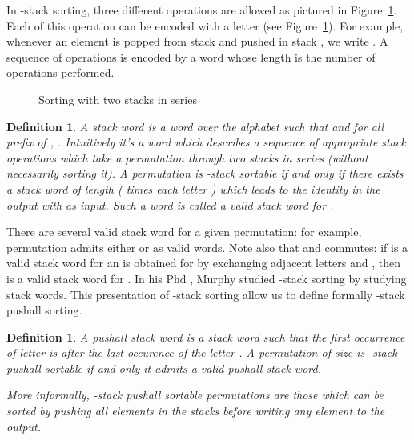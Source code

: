 \documentclass[11pt]{article}
\newtheorem{defn}[thm]{Definition}
\begin{document}
In -stack sorting, three different operations are allowed as pictured in Figure~\ref{fig:rholambdamu}. 
Each of this operation can be encoded with a letter (see Figure~\ref{fig:rholambdamu}).
For example, whenever an element is popped from stack  and pushed in stack , we write . 
A sequence of operations is encoded by a word whose length is the number of operations performed.

\begin{figure}[H]
\begin{center}
\caption{Sorting with two stacks in series \label{fig:rholambdamu}}
\end{center}
\end{figure}

\begin{defn}
A {\em stack word}  is a word over the alphabet  such that  and for all prefix  of , . 
Intuitively it's a word which describes a sequence of appropriate stack operations which take a permutation through two stacks in series (without necessarily sorting it).
A permutation  is -stack sortable if and only if there exists a stack word of length  ( times each letter ) which leads to the identity in the output with  as input. 
Such a word is called a {\em valid} stack word for .
\end{defn}

There are several valid stack word for a given permutation: for example, permutation  admits either  or  as valid words.
Note also that  and  commutes: if  is a valid stack word for  an  is obtained for  by exchanging adjacent letters  and , then  is a valid stack word for . 
In his Phd \cite{Murphy02}, Murphy studied -stack sorting by studying stack words. 
This presentation of -stack sorting allow us to define formally -stack pushall sorting.

\begin{defn}
A {\em pushall} stack word is a stack word such that the first occurrence of letter  is after the last occurence of the letter .
A permutation  of size  is -stack pushall sortable if and only it admits a valid pushall stack word.

More informally, -stack pushall sortable permutations are those which can be sorted by pushing all elements in the stacks before writing any element to the output.
\end{defn}
\end{document}
